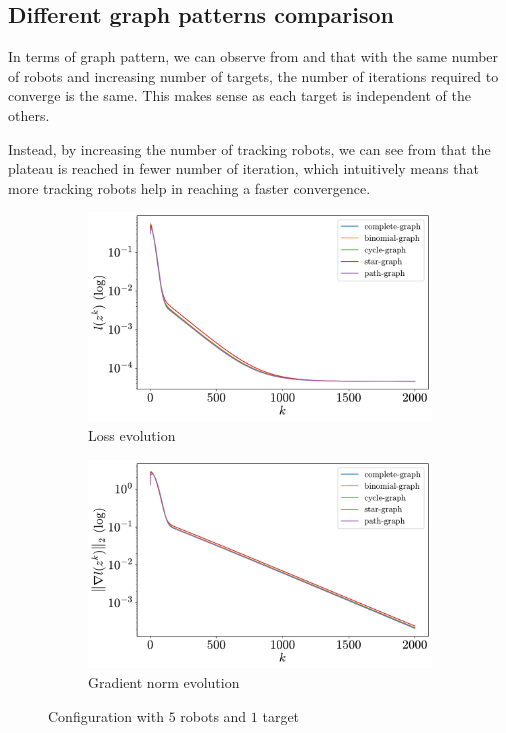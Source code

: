 \documentclass[a4paper,11pt,oneside]{book}
\begin{document}
\subsection{Different graph patterns comparison}

In terms of graph pattern, we can observe from  and  that with the same number of robots and increasing number of targets, the number of iterations required to converge is the same. This makes sense as each target is independent of the others.

Instead, by increasing the number of tracking robots, we can see from  that the plateau is reached in fewer number of iteration, which intuitively means that more tracking robots help in reaching a faster convergence.

\begin{figure}[H]
      \centering
      \begin{subfigure}[t]{0.49\textwidth}
            \centering
            \includegraphics[width=\linewidth]{./figs/tracking/loss_5_1_2_2000.pdf} 
            \caption{Loss evolution}
      \end{subfigure}
      \hfill
      \begin{subfigure}[t]{0.49\textwidth}
            \centering
            \includegraphics[width=\linewidth]{./figs/tracking/gradient_5_1_2_2000.pdf} 
            \caption{Gradient norm evolution}
      \end{subfigure}
      \caption{Configuration with $5$ robots and $1$ target}
      \label{fig:tracking_5_1}
\end{figure}
\end{document}
